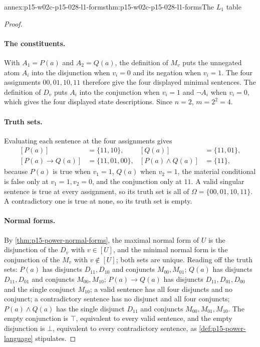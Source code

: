 \begin{annexitem}{annex:p15-w02c-p15-028-l1-forms}{thm:p15-w02c-p15-028-l1-forms}{The \(L_1\) table}
\begin{proof}
\paragraph{The constituents.}
With \(A_1=P(a)\) and \(A_2=Q(a)\), the definition of \(M_v\) puts the
unnegated atom \(A_i\) into the disjunction when \(v_i=0\) and its
negation when \(v_i=1\). The four assignments \(00,01,10,11\) therefore
give the four displayed minimal sentences. The definition of \(D_v\)
puts \(A_i\) into the conjunction when \(v_i=1\) and \(\neg A_i\) when
\(v_i=0\), which gives the four displayed state descriptions. Since
\(n=2\), \(m=2^2=4\).

\paragraph{Truth sets.}
Evaluating each sentence at the four assignments gives
\[
\begin{aligned}
 [P(a)]&=\{11,10\}, & [Q(a)]&=\{11,01\},\\
 [P(a)\to Q(a)]&=\{11,01,00\}, & [P(a)\land Q(a)]&=\{11\},
\end{aligned}
\]
because \(P(a)\) is true when \(v_1=1\), \(Q(a)\) when \(v_2=1\), the
material conditional is false only at \(v_1=1,v_2=0\), and the
conjunction only at \(11\). A valid singular sentence is true at every
assignment, so its truth set is all of \(\Omega=\{00,01,10,11\}\). A
contradictory one is true at none, so its truth set is empty.

\paragraph{Normal forms.}
By \cref{thm:p15-power-normal-forms}, the maximal normal form of \(U\)
is the disjunction of the \(D_v\) with \(v\in[U]\), and the minimal
normal form is the conjunction of the \(M_v\) with \(v\notin[U]\); both
sets are unique. Reading off the truth sets:
\(P(a)\) has disjuncts \(D_{11},D_{10}\) and conjuncts
\(M_{00},M_{01}\); \(Q(a)\) has disjuncts \(D_{11},D_{01}\) and
conjuncts \(M_{00},M_{10}\); \(P(a)\to Q(a)\) has disjuncts
\(D_{11},D_{01},D_{00}\) and the single conjunct \(M_{10}\); a valid
sentence has all four disjuncts and no conjunct; a contradictory
sentence has no disjunct and all four conjuncts; \(P(a)\land Q(a)\) has
the single disjunct \(D_{11}\) and conjuncts \(M_{00},M_{01},M_{10}\).
The empty conjunction is \(\top\), equivalent to every valid sentence,
and the empty disjunction is \(\bot\), equivalent to every
contradictory sentence, as \cref{def:p15-power-language} stipulates.


\end{proof}
\end{annexitem}
